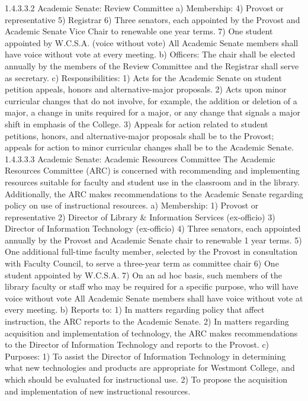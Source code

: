 \documentclass[letterpaper, 11pt]{article}
\begin{document}
1.4.3.3.2 Academic Senate:  Review Committee
a) Membership:
4) Provost or representative
5) Registrar
6) Three senators, each appointed by the Provost and Academic Senate Vice Chair to renewable one year terms.
7) One student appointed by W.C.S.A. (voice without vote)
   All Academic Senate members shall have voice without vote at every meeting.
b) Officers:
   The chair shall be elected annually by the members of the Review Committee and the Registrar shall serve as secretary.
c) Responsibilities:
1) Acts for the Academic Senate on student petition appeals, honors and alternative-major proposals.
2) Acts upon minor curricular changes that do not involve, for example, the addition or deletion of a major, a change in units required for a major, or any change that signals a major shift in emphasis of the College.
3) Appeals for action related to student petitions, honors, and alternative-major proposals shall be to the Provost; appeals for action to minor curricular changes shall be to the Academic Senate.
1.4.3.3.3 Academic Senate:  Academic Resources Committee
   The Academic Resources Committee (ARC) is concerned with recommending and implementing resources suitable for faculty and student use in the classroom and in the library.  Additionally, the ARC makes recommendations to the Academic Senate regarding policy on use of instructional resources.
a) Membership: 
1) Provost or representative
2) Director of Library \& Information Services (ex-officio)
3) Director of Information Technology (ex-officio)
4) Three senators, each appointed annually by the Provost and Academic Senate chair to renewable 1 year terms.
5) One additional full-time faculty member, selected by the Provost in consultation with Faculty Council, to serve a three-year term as committee chair
6) One student appointed by W.C.S.A.
7) On an ad hoc basis, such members of the library faculty or staff who may be required for a specific purpose, who will have voice without vote
   All Academic Senate members shall have voice without vote at every meeting.
b) Reports to:
1) In matters regarding policy that affect instruction, the ARC reports to the Academic Senate.
2) In matters regarding acquisition and implementation of technology, the ARC makes recommendations to the Director of Information Technology and reports to the Provost.
c) Purposes:
1) To assist the Director of Information Technology in determining what new technologies and products are appropriate for Westmont College, and which should be evaluated for instructional use.
2) To propose the acquisition and implementation of new instructional resources.
\end{document}
